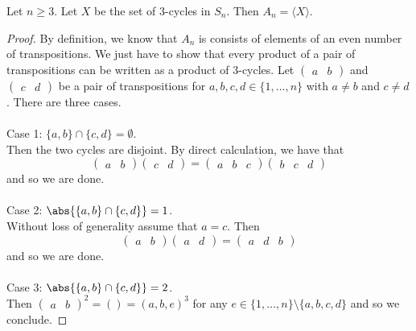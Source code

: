 \documentclass[a4paper]{article}
\begin{document}
\begin{lmm}{}{} Let $n\geq 3$. Let $X$ be the set of $3$-cycles in $S_n$. Then $A_n=\langle X\rangle$. \tcbline
\begin{proof}
By definition, we know that $A_n$ is consists of elements of an even number of transpositions. We just have to show that every product of a pair of transpositions can be written as a product of $3$-cycles. Let $\begin{pmatrix}a&b\end{pmatrix}$ and $\begin{pmatrix}c&d\end{pmatrix}$ be a pair of transpositions for $a,b,c,d\in\{1,\dots,n\}$ with $a\neq b$ and $c\neq d$. There are three cases. \\~\\

Case 1: $\{a,b\}\cap\{c,d\}=\emptyset$. \\
Then the two cycles are disjoint. By direct calculation, we have that $$\begin{pmatrix}a&b\end{pmatrix}\begin{pmatrix}c&d\end{pmatrix}=\begin{pmatrix}a&b&c\end{pmatrix}\begin{pmatrix}b&c&d\end{pmatrix}$$ and so we are done. \\~\\

Case 2: $\abs{\{a,b\}\cap\{c,d\}}=1$. \\
Without loss of generality assume that $a=c$. Then $$\begin{pmatrix}a&b\end{pmatrix}\begin{pmatrix}a&d\end{pmatrix}=\begin{pmatrix}a&d&b\end{pmatrix}$$ and so we are done. \\~\\

Case 3: $\abs{\{a,b\}\cap\{c,d\}}=2$. \\
Then $\begin{pmatrix}a&b\end{pmatrix}^2=()=(a,b,e)^3$ for any $e\in\{1,\dots,n\}\setminus\{a,b,c,d\}$ and so we conclude. 
\end{proof}
\end{lmm}
\end{document}
